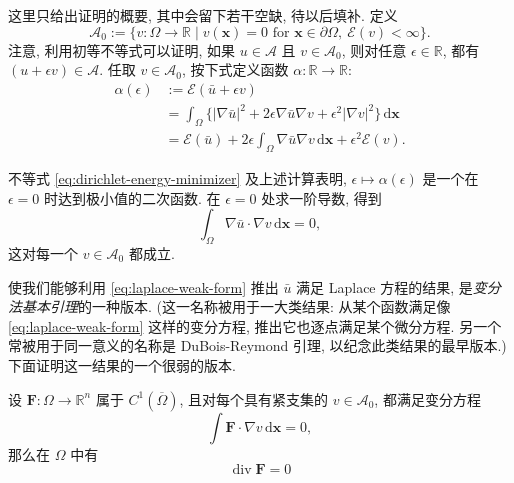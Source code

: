 \begin{Proof}这里只给出证明的概要, 其中会留下若干空缺, 待以后填补. 定义
\begin{equation}\label{eq:zero-boundary-admissible-class}
\mathcal{A}_0:=\{v:\Omega\to\mathbb{R}\mid v(\bm{x})=0\text{ for }\bm{x}\in\partial\Omega,\ \mathcal{E}(v)<\infty\}.
\end{equation}
注意, 利用初等不等式可以证明, 如果 $u\in\mathcal{A}$ 且 $v\in\mathcal{A}_0$, 则对任意 $\epsilon\in\mathbb{R}$, 都有 $(u+\epsilon v)\in\mathcal{A}$. 任取 $v\in\mathcal{A}_0$, 按下式定义函数 $\alpha:\mathbb{R}\to\mathbb{R}$:
\begin{equation}\label{eq:dirichlet-energy-variation}
\begin{aligned}
\alpha(\epsilon)&:=\mathcal{E}(\bar u+\epsilon v)\\
&=\int_\Omega\{|\nabla\bar u|^2+2\epsilon\nabla\bar u\nabla v+\epsilon^2|\nabla v|^2\}\,\mathrm{d}\bm{x}\\
&=\mathcal{E}(\bar u)+2\epsilon\int_\Omega\nabla\bar u\nabla v\,\mathrm{d}\bm{x}+\epsilon^2\mathcal{E}(v).
\end{aligned}
\end{equation}


不等式 \eqref{eq:dirichlet-energy-minimizer} 及上述计算表明, $\epsilon\mapsto\alpha(\epsilon)$ 是一个在 $\epsilon=0$ 时达到极小值的二次函数. 在 $\epsilon=0$ 处求一阶导数, 得到
\begin{equation}\label{eq:laplace-weak-form}
\int_\Omega\nabla\bar u\cdot\nabla v\,\mathrm{d}\bm{x}=0,
\end{equation}
这对每一个 $v\in\mathcal{A}_0$ 都成立.

使我们能够利用 \eqref{eq:laplace-weak-form} 推出 $\bar u$ 满足 Laplace 方程的结果, 是\emph{变分法基本引理}的一种版本. (这一名称被用于一大类结果: 从某个函数满足像 \eqref{eq:laplace-weak-form} 这样的变分方程, 推出它也逐点满足某个微分方程. 另一个常被用于同一意义的名称是 DuBois-Reymond 引理, 以纪念此类结果的最早版本.) 下面证明这一结果的一个很弱的版本.

\begin{Lemma}
\label{lem:variational-divergence}
设 $\bm{F}:\Omega\to\mathbb{R}^n$ 属于 $C^1(\overline\Omega)$, 且对每个具有紧支集的 $v\in\mathcal{A}_0$, 都满足变分方程
\begin{equation}\label{eq:variational-divergence-identity}
\int\bm{F}\cdot\nabla v\,\mathrm{d}\bm{x}=0,
\end{equation}
那么在 $\Omega$ 中有
\begin{equation}\label{eq:variational-divergence-zero}
\operatorname{div}\bm{F}=0
\end{equation}


\end{Lemma}
\end{Proof}
